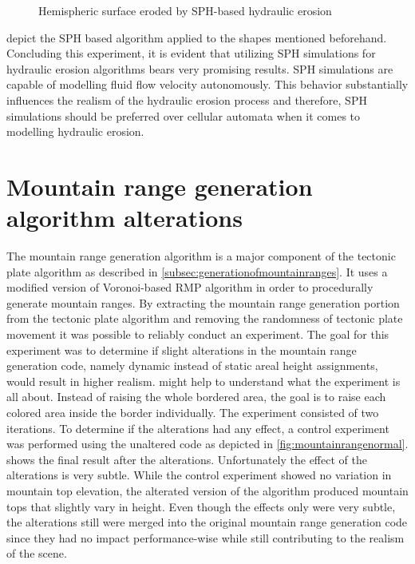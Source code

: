 \documentclass[11pt,a4paper,twoside,openright]{report}
\begin{document}
\begin{figure}[!htb]
  \caption{Hemispheric surface eroded by SPH-based hydraulic erosion}\label{fig:hydro6}
\endminipage
\end{figure}
 depict the SPH based algorithm applied to the shapes mentioned beforehand. Concluding this experiment, it is evident that utilizing SPH simulations for hydraulic erosion algorithms bears very promising results. SPH simulations are capable of modelling fluid flow velocity autonomously. This behavior substantially influences the realism of the hydraulic erosion process and therefore, SPH simulations should be preferred over cellular automata when it comes to modelling hydraulic erosion.

\section{Mountain range generation algorithm alterations}
The mountain range generation algorithm is a major component of the tectonic plate algorithm as described in \cref{subsec:generationofmountainranges}. It uses a modified version of Voronoi-based RMP algorithm in order to procedurally generate mountain ranges. By extracting the mountain range generation portion from the tectonic plate algorithm and removing the randomness of tectonic plate movement it was possible to reliably conduct an experiment. The goal for this experiment was to determine if slight alterations in the mountain range generation code, namely dynamic instead of static areal height assignments, would result in higher realism.  might help to understand what the experiment is all about. Instead of raising the whole bordered area, the goal is to raise each colored area inside the border individually. The experiment consisted of two iterations. To determine if the alterations had any effect, a control experiment was performed using the unaltered code as depicted in \cref{fig:mountainrangenormal}.  shows the final result after the alterations. Unfortunately the effect of the alterations is very subtle. While the control experiment showed no variation in mountain top elevation, the alterated version of the algorithm produced mountain tops that slightly vary in height. Even though the effects only were very subtle, the alterations still were merged into the original mountain range generation code since they had no impact performance-wise while still contributing to the realism of the scene.
\end{document}
